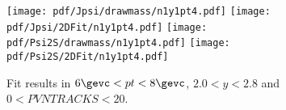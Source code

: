 \begin{figure}[H]
\begin{center}
\texttt{[image: pdf/Jpsi/drawmass/n1y1pt4.pdf]}
\texttt{[image: pdf/Jpsi/2DFit/n1y1pt4.pdf]}
\vspace*{-0.5cm}
\texttt{[image: pdf/Psi2S/drawmass/n1y1pt4.pdf]}
\texttt{[image: pdf/Psi2S/2DFit/n1y1pt4.pdf]}
\vspace*{-0.5cm}
\end{center}
\caption{Fit results in $6\gevc<pt<8\gevc$, $2.0<y<2.8$ and $0<PVNTRACKS<20$.}
\label{Fitn1y1pt4}
\end{figure}

